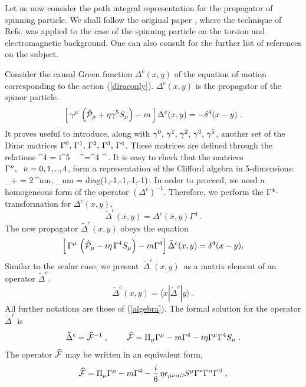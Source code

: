 Let us now consider the path integral representation for the 
propagator of spinning particle. We shall follow the original paper 
\cite{gegi}, where the technique of Refs. \cite{FraGi91} was 
applied to the case of the spinning particle on the torsion and 
electromagnetic background. One can also consult
\cite{gegi} for the further list of references on the subject.

Consider the causal Green function $\Delta^c(x,y)$ of the equation
of motion corresponding to the action (\ref{diraconly}).
$\Delta^c(x,y)$ is the propagator of the spinor particle.
\begin{equation}
\label{b1}
 \left[\,\gamma^\mu\,\left(\hat{{\cal P}}_\mu
+ \eta\gamma^5 S_\mu \right) - m\,\right]\Delta^c(x,y)= -
\delta^4(x-y)\;.
\end{equation}
It proves useful to introduce, along with
$\gamma^0,\,\gamma^1,\,\gamma^2,\,\gamma^3,\,\gamma^5$,
another set of the Dirac matrices
$\Gamma^0,\,\Gamma^1,\,\Gamma^2,\,\Gamma^3,\,\Gamma^4$. These matrices are
defined through the relations
\beq
\Ga^4 = i\ga^5\;\,\,\,\,\, \;\; \Ga^\mu =\Ga^4 \ga^\mu\,.
\label{b3}
\eeq
It is easy to check that the matrices $\Gamma^n,\,\,\;n = 0,1,..,4$,
form a representation of the Clifford algebra in 5-dimensions:
\beq
\left[ \Ga^n, \Ga^m \right]_+ =
2\,\eta^{nm}\;,\;\;\;\;\;\;\; \eta_{nm} = {\rm
diag}(1,-1,-1,-1,-1)\,.
\label{bbb3}
\eeq
In order to proceed, we
need a homogeneous form of the operator $(\Delta^c)^{-1}$.
Therefore, we perform the $\Gamma^4$-transformation for $\Delta^c(x,y)$.
$$
\tilde{\Delta}^c(x,y) = \Delta^c(x,y)\Gamma^4\,.
$$
The new propagator $\tilde{\Delta}^c(x,y)$ obeys the equation
\begin{equation}
\label{b2}
 \left[\,\Gamma^\mu\,\left(\hat{{\cal P}}_\mu
- i\eta \,\Gamma^4 S_\mu \right) - m\Gamma^4\right]
\tilde{\Delta}^c(x,y)= \delta^4(x-y),
\end{equation}
Similar to the scalar case, we present $\,\tilde{\Delta}^c(x,y)\,$ 
as a matrix element of an operator $\tilde{\Delta}^c$.
$$ %
\tilde{\Delta}^c(x,y)
= \langle x | \tilde{\Delta}^c | y
\rangle\;.
$$ %
All further notations are those of (\ref{algebra}).
The formal solution for the operator $ \tilde{\Delta}^c$ is
$$
\tilde{\Delta}^c = {\widehat {\cal F}}^{-1}\;,\;\;\;\;\;\;\;\;
{\widehat {\cal F}}=\Pi_\mu\Gamma^\mu -
m \Gamma^4 - i\eta\Gamma^\mu\Gamma^4 S_{\mu}\;.
$$
The operator ${\widehat {\cal F}}$ may be written in an
equivalent form, \begin{equation}\label{b5}
{\widehat{\cal F}}=\Pi_\mu\Gamma^\mu -
m \Gamma^4-
\frac{i}{6}\,\eta\epsilon_{\mu\nu\alpha\beta}S^{\mu}\Gamma^{\nu}
\Gamma^\alpha\Gamma^\beta \;,
\end{equation}
